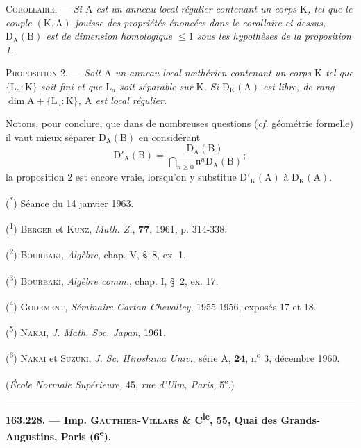 \textsc{Corollaire.} --- \textit{Si $\mathrm A$ est un anneau local régulier contenant un corps $\mathrm K$, tel que le couple $(\mathrm K,\mathrm A)$ jouisse des propriétés énoncées dans le corollaire ci-dessus, $\mathrm D_{\mathrm A}(\mathrm B)$ est de dimension homologique $\leq1$ sous les hypothèses de la proposition 1.}

\textsc{Proposition 2.} --- \textit{Soit $\mathrm A$ un anneau local nœthérien contenant un corps $\mathrm K$ tel que $\{\mathrm L_a:\mathrm K\}$ soit fini et que $\mathrm L_a$ soit séparable sur $\mathrm K$. Si $\mathrm D_{\mathrm K}(\mathrm A)$ est libre, de rang $\dim\mathrm A+\{\mathrm L_a:\mathrm K\}$, $\mathrm A$ est local régulier.}

Notons, pour conclure, que dans de nombreuses questions (\textit{cf.} géométrie formelle) il vaut mieux séparer $\mathrm D_{\mathrm A}(\mathrm B)$ en considérant
\[
\mathrm D'_{\mathrm A}(\mathrm B)=\frac{\mathrm D_{\mathrm A}(\mathrm B)}{\displaystyle\bigcap_{n\geq0}\mathfrak n^n\mathrm D_{\mathrm A}(\mathrm B)};
\]
la proposition 2 est encore vraie, lorsqu’on y substitue $\mathrm D'_{\mathrm K}(\mathrm A)$ à $\mathrm D_{\mathrm K}(\mathrm A)$.

(\textsuperscript{*}) Séance du 14 janvier 1963.

(\textsuperscript{1}) \textsc{Berger} et \textsc{Kunz}, \textit{Math. Z.}, \textbf{77}, 1961, p. 314-338.

(\textsuperscript{2}) \textsc{Bourbaki}, \textit{Algèbre}, chap. V, \S~8, ex. 1.

(\textsuperscript{3}) \textsc{Bourbaki}, \textit{Algèbre comm.}, chap. I, \S~2, ex. 17.

(\textsuperscript{4}) \textsc{Godement}, \textit{Séminaire Cartan-Chevalley}, 1955-1956, exposés 17 et 18.

(\textsuperscript{5}) \textsc{Nakai}, \textit{J. Math. Soc. Japan}, 1961.

(\textsuperscript{6}) \textsc{Nakai} et \textsc{Suzuki}, \textit{J. Sc. Hiroshima Univ.}, série A, \textbf{24}, n\textsuperscript{o} 3, décembre 1960.

\hfill(\textit{École Normale Supérieure,} 45, \textit{rue d’Ulm, Paris,} 5\textsuperscript{e}.)
\noindent\rule{\linewidth}{0.4pt}

\textbf{163.228. --- Imp. \textsc{Gauthier-Villars} \& C\textsuperscript{ie}, 55, Quai des Grands-Augustins, Paris (6\textsuperscript{e}).}

